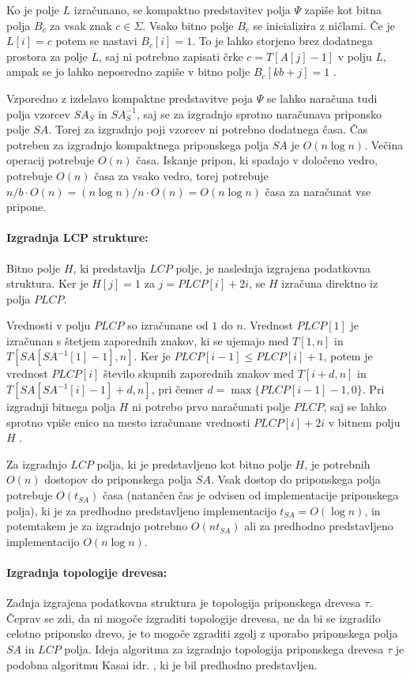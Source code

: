 Ko je polje $L$ izračunano, se kompaktno predstavitev polja $\Psi$ zapiše kot bitna polja $B_c$ za vsak znak $c\in \Sigma$. Vsako bitno polje $B_c$ se inicializira z ničlami. Če je $L[i]=c$ potem se nastavi $B_c[i]=1$. To je lahko storjeno brez dodatnega prostora za polje $L$, saj ni potrebno zapisati črke $c=T[A[j]-1]$ v polju $L$, ampak se jo lahko neposredno zapiše v bitno polje $B_c[kb+j]=1$ \cite{Navarro2016}.

Vzporedno z izdelavo kompaktne predstavitve poja $\Psi$ se lahko naračuna tudi polja vzorcev $SA_S$ in $SA_S^{-1}$, saj se za izgradnjo sprotno naračunava priponsko polje $SA$. Torej za izgradnjo poji vzorcev ni potrebno dodatnega časa. Čas potreben za izgradnjo kompaktnega priponskega polja $SA$ je $O(n\log{n})$. Večina operacij potrebuje $O(n)$ časa. Iskanje pripon, ki spadajo v določeno vedro, potrebuje $O(n)$ časa za vsako vedro, torej potrebuje $n/b\cdot O(n)=(n\log{n})/n\cdot O(n)=O(n\log{n})$ časa za naračunat vse pripone. 

\paragraph{Izgradnja LCP strukture:}
Bitno polje $H$, ki predstavlja $LCP$ polje, je naslednja izgrajena podatkovna struktura. Ker je $H[j]=1$ za $j=PLCP[i]+2i$, se $H$ izračuna direktno iz polja $PLCP$.

Vrednosti v polju $PLCP$ so izračunane od $1$ do $n$. Vrednost $PLCP[1]$ je izračunan s štetjem zaporednih znakov, ki se ujemajo med $T[1,n]$ in $T[SA[SA^{-1}[1]-1],n]$. Ker je $PLCP[i-1]\le PLCP[i]+1$, potem je vrednost $PLCP[i]$ število skupnih zaporednih znakov med $T[i+d,n]$ in $T[SA[SA^{-1}[i]-1]+d,n]$, pri čemer $d=\max\{PLCP[i-1]-1,0\}$.
Pri izgradnji bitnega polja $H$ ni potrebo prvo naračunati polje $PLCP$, saj se lahko sprotno vpiše enico na mesto izračunane vrednosti $PLCP[i]+2i$ v bitnem polju $H$ \cite{Navarro2016}.

Za izgradnjo $LCP$ polja, ki je predstavljeno kot bitno polje $H$, je potrebnih $O(n)$ dostopov do priponskega polja $SA$. Vsak dostop do priponskega polja potrebuje $O(t_{SA})$ časa (natančen čas je odvisen od implementacije priponskega polja), ki je za predhodno predstavljeno implementacijo $t_{SA}= O(\log{n})$, in potemtakem je za izgradnjo potrebno $O(nt_{SA})$ ali za predhodno predstavljeno implementacijo $O(n\log{n})$.

\paragraph{Izgradnja topologije drevesa:}
Zadnja izgrajena podatkovna struktura je topologija priponskega drevesa $\tau$. Čeprav se zdi, da ni mogoče izgraditi topologije drevesa, ne da bi se izgradilo celotno priponsko drevo, je to mogoče zgraditi zgolj z uporabo priponskega polja $SA$ in $LCP$ polja. Ideja algoritma za izgradnjo topologija priponskega drevesa $\tau$ je podobna algoritmu Kasai idr. \cite{Kasai2001}, ki je bil predhodno predstavljen.


